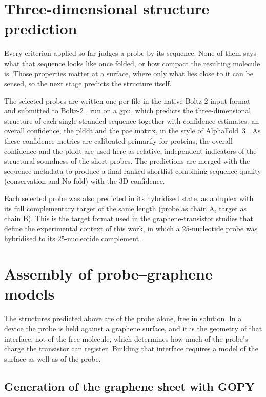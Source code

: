 \section{Three-dimensional structure prediction}

Every criterion applied so far judges a probe by its sequence. None of them says what that
sequence looks like once folded, or how compact the resulting molecule is. Those properties matter
at a surface, where only what lies close to it can be sensed, so the next stage predicts the
structure itself.

The selected probes are written one per file in the native Boltz-2 input format and submitted to Boltz-2
\citep{wohlwend2024}, run on a \acrshort{gpu}, which predicts the three-dimensional structure of each single-stranded
sequence together with confidence estimates: an overall confidence, the \acrfull{plddt} and the \acrfull{pae}
matrix, in the style of AlphaFold~3 \citep{abramson2024}. As these confidence metrics are calibrated
primarily for proteins, the overall confidence and the \acrshort{plddt} are used here as relative,
independent indicators of the structural soundness of the short probes. The predictions are merged with the
sequence metadata to produce a final ranked shortlist combining sequence quality (conservation and No-fold)
with the 3D confidence.

Each selected probe was also predicted in its hybridised state, as a duplex with its full complementary
target of the same length (probe as chain A, target as chain B). This is the target format used in the
graphene-transistor studies that define the experimental context of this work, in which a
$25$-nucleotide probe was hybridised to its $25$-nucleotide complement \citep{campos2019,purwidyantri2021}.

\section{Assembly of probe--graphene models}
\label{sec:complex}

The structures predicted above are of the probe alone, free in solution. In a device the probe is
held against a graphene surface, and it is the geometry of that interface, not of the free
molecule, which determines how much of the probe's charge the transistor can register. Building
that interface requires a model of the surface as well as of the probe.

\subsection{Generation of the graphene sheet with GOPY}

